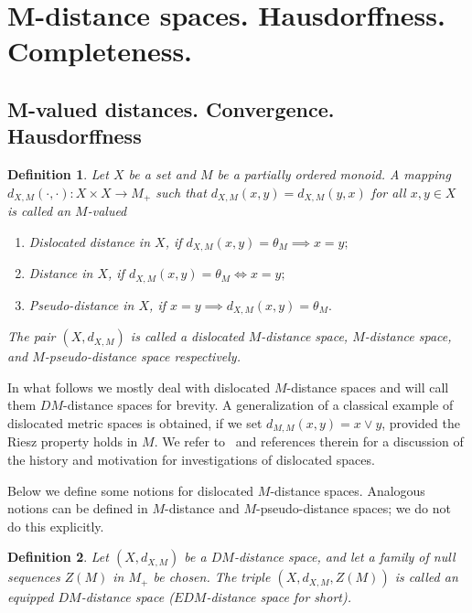 \documentclass[12pt]{amsart}          %
\newtheorem{definition}{Definition}
\begin{document}
\section{M-distance spaces. Hausdorffness. Completeness.}
\subsection{M-valued distances. Convergence. Hausdorffness }
\begin{definition}
Let $X$ be a set and $M$ be a partially ordered monoid. A mapping $d_{X,M}(\cdot,\cdot)\colon X\times X\to M_+$ such that $d_{X,M}(x,y) = d_{X,M}(y,x)$ for all $x,y\in X$ is called an $M$-valued
\begin{enumerate}
\item  Dislocated distance in $X$,  if  
$     d_{X,M}(x,y)=\theta_M \implies x=y;$
\item Distance in $X$,  if \hspace{1.5cm}
$
     d_{X,M}(x,y)=\theta_M\iff x=y;
$
\item Pseudo-distance in $X$, if \hspace{0.4cm}
$
    x= y \implies d_{X,M}(x,y)=\theta_M.
$
\end{enumerate}
 
The pair $(X,d_{X,M})$ is called a dislocated $M$-distance space, $M$-distance space, and $M$-pseudo-distance space respectively.
\end{definition}

In what follows we mostly deal with dislocated $M$-distance spaces and will call them $DM$-distance spaces for brevity.  A generalization of a classical example of dislocated metric spaces is obtained, if we set  $d_{M,M}(x,y)=x\vee y$, provided the Riesz property holds in $M$. We refer to~\cite{Hitzler} and references therein for a discussion of the history and motivation for investigations of dislocated spaces.

{Below we define some notions for dislocated $M$-distance spaces. Analogous notions can be defined in $M$-distance and $M$-pseudo-distance spaces; we do not do this explicitly.}

\begin{definition}
Let $(X, d_{X,M})$ be a $DM$-distance space, and let a family of null sequences $Z(M)$ in $M_+$ be chosen. 
The triple $(X, d_{X,M},Z(M))$ is called an equipped  $DM$-distance space ($EDM$-distance space for short).
\end{definition}
\end{document}
